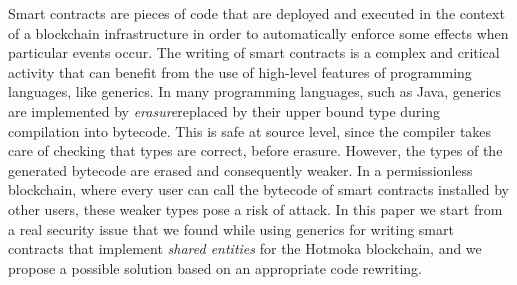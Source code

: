 Smart contracts are pieces of code that are deployed and executed in the context of a blockchain infrastructure in order to automatically enforce some effects when particular events occur. The writing of smart contracts is a complex and critical activity that can benefit from the use of high-level features of programming languages, like generics. In many programming languages, such as Java, generics are implemented by \emph{erasure}\ie replaced by their upper bound type during compilation into bytecode. This is safe at source level, since the compiler takes care of checking that types are correct, before erasure. However, the types of the generated bytecode are erased and consequently weaker. In a permissionless blockchain, where every user can call the bytecode of smart contracts installed by other users, these weaker types pose a risk of attack. In this paper we start from a real security issue that we found while using generics for writing smart contracts that implement \emph{shared entities} for the Hotmoka blockchain, and we propose a possible solution based on an appropriate code rewriting.
